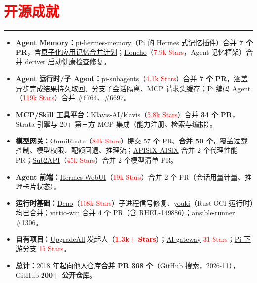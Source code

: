 \documentclass[10pt,a4paper]{article}
\begin{document}
\section*{\textcolor{red}{开源成就}}
\vspace*{-4ex}
\noindent\textcolor{red}{\rule{\linewidth}{0.4pt}}
\begin{itemize}
	\item \textbf{Agent Memory：}\href{https://github.com/chandra447/pi-hermes-memory/pulls?q=author\%3Axz-dev+is\%3Amerged}{pi-hermes-memory}（Pi 的 Hermes 式记忆插件）合并 \textbf{7 个 PR}，含\href{https://github.com/chandra447/pi-hermes-memory/pull/142}{原子化应用记忆合并计划}；\href{https://github.com/plastic-labs/honcho/pull/689}{Honcho}（\textcolor{red}{7.9k Stars}，Agent 记忆框架）合并 deriver 启动健康检查修复。
	\item \textbf{Agent 运行时/子 Agent：}\href{https://github.com/nicobailon/pi-subagents/pulls?q=author\%3Axz-dev+is\%3Amerged}{pi-subagents}（\textcolor{red}{4.1k Stars}）合并 \textbf{7 个 PR}，涵盖异步完成结果持久取回、分支子会话隔离、MCP 请求头缓存；\href{https://github.com/earendil-works/pi}{Pi 编码 Agent}（\textcolor{red}{119k Stars}）合并 \href{https://github.com/earendil-works/pi/pull/6764}{\#6764}、\href{https://github.com/earendil-works/pi/pull/6697}{\#6697}。
	\item \textbf{MCP/Skill 工具平台：}\href{https://github.com/Klavis-AI/klavis/pulls?q=author\%3Axz-dev+is\%3Amerged}{Klavis-AI/klavis}（\textcolor{red}{5.8k Stars}）合并 \textbf{34 个 PR}，Strata 引擎与 20+ 第三方 MCP 集成（能力注册、检索与编排）。
	\item \textbf{模型网关：}\href{https://github.com/cheaper-inference/OmniRoute/pulls?q=author\%3Axz-dev+is\%3Amerged}{OmniRoute}（\textcolor{red}{84k Stars}）提交 57 个 PR、\textbf{合并 50 个}，覆盖过载控制、模型权限、配额回退、推理流；\href{https://github.com/api7/aisix/pull/1387}{APISIX AISIX} 合并 2 个代理性能 PR；\href{https://github.com/Wei-Shaw/sub2api/pull/7215}{Sub2API}（\textcolor{red}{45k Stars}）合并 2 个模型清单 PR。
	\item \textbf{Agent 前端：}\href{https://github.com/nesquena/hermes-webui}{Hermes WebUI}（\textcolor{red}{19k Stars}）合并 2 个 PR（会话用量计量、推理卡片状态）。
	\item \textbf{运行时基础：}\href{https://github.com/denoland/deno/pull/36644}{Deno}（\textcolor{red}{108k Stars}）子进程信号修复、\href{https://github.com/youki-dev/youki/pull/3867}{youki}（Rust OCI 运行时）均已合并；\href{https://github.com/virtio-win/kvm-guest-drivers-windows/pulls?q=is\%3Apr+author\%3Axz-dev+is\%3Amerged}{virtio-win} 合并 4 个 PR（含 RHEL-149886）；\href{https://github.com/ansible/ansible-runner/pull/1306}{ansible-runner} \#1306。
	\item \textbf{自有项目：}\href{https://github.com/DUpdateSystem/UpgradeAll}{UpgradeAll} 发起人（\textbf{\textcolor{red}{1.3k+ Stars}}）；\href{https://github.com/xz-dev/AI-gateway}{AI-gateway} \textcolor{red}{31 Stars}；\href{https://github.com/xz-dev/pi}{Pi 下游分支} \textcolor{red}{16 Stars}。
	\item \textbf{总计：}2018 年起向他人仓库\textbf{合并 PR 368 个}（GitHub 搜索，2026-11），GitHub \textbf{200+ 公开仓库}。
\end{itemize}
\end{document}
